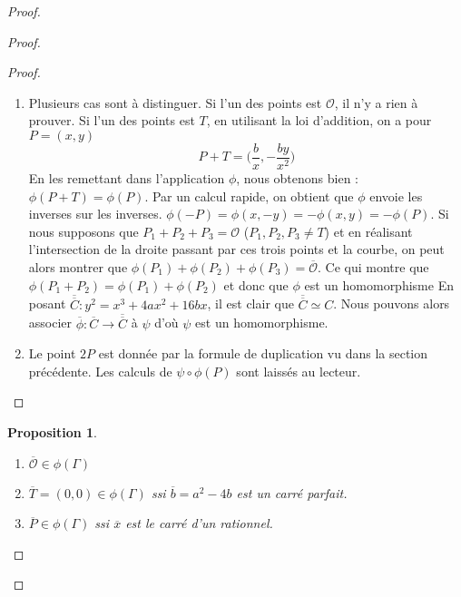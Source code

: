 \documentclass[a4paper]{article}
\newtheorem{prop}{Proposition}
\begin{document}
\begin{proof}
\begin{proof}
\begin{proof}
\begin{enumerate}
\item Plusieurs cas sont à distinguer. Si l'un des points est $\mathcal{O}$, il n'y a rien à prouver.
Si l'un des points est $T$, en utilisant la loi d'addition, on a pour $P=(x,y)$
\begin{equation*}
P+T=\Big(\frac{b}{x},-\frac{by}{x^2}\Big)
\end{equation*}
En les remettant dans l'application $\phi$, nous obtenons bien : $\phi(P+T)=\phi(P)$. Par un calcul rapide, on obtient que $\phi$ envoie les inverses sur les inverses. 
$\phi(-P)= \phi(x,-y)=-\phi(x,y)=-\phi(P)$.
Si nous supposons que $P_{1}+P_{2}+P_{3}=\mathcal{O}$ ($P_{1},P_{2},P_{3} \ne T$) et en réalisant  l'intersection de la droite passant par ces trois points et la courbe, on peut alors montrer que $\phi(P_{1})+\phi(P_{2})+\phi(P_{3})=\overline{\mathcal{O}}$. Ce qui montre que $\phi(P_{1}+P_{2})=\phi(P_{1})+\phi(P_{2})$ et donc que $\phi$ est un homomorphisme
En posant $\overline{\overline{C}}: y^2=x^3+4ax^2+16bx$, il est clair que $\overline{\overline{C}} \simeq C$.
Nous pouvons alors associer $\overline{\phi} : \overline{C} \rightarrow \overline{\overline{C}}$ à $ \psi$ d'où $\psi$ est un homomorphisme. \\
\item Le point $2P$ est donnée par la formule de duplication vu dans la section précédente. Les calculs de $\psi \circ \phi(P)$ sont laissés au lecteur.
\end{enumerate}
\end{proof}
 

\begin{prop} 
\begin{enumerate}
\item $\overline{\mathcal{O}} \in \phi(\Gamma) $
\item $ \overline{T}=(0,0) \in \phi(\Gamma)$ ssi $\overline{b}=a^2-4b$ est un carré parfait.
\item $\overline{P} \in \phi(\Gamma)$ ssi $\overline{x}$ est le carré d'un rationnel.
\end{enumerate}
\end{prop}


\end{proof}
\end{proof}
\end{document}
